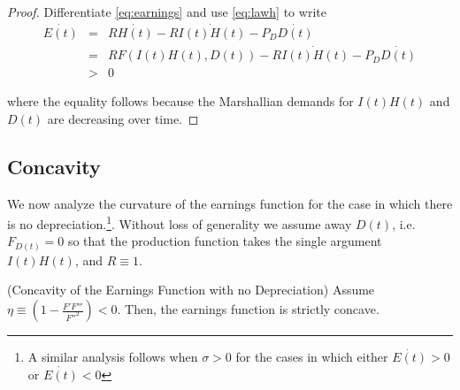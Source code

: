 \begin{proof}
Differentiate \eqref{eq:earnings} and use \eqref{eq:lawh} to write
\begin{eqnarray}
\dot{E(t)} &=& R \dot{H(t)} - R \dot{I(t)H(t)} - P_{D} \dot{D(t)} \nonumber \\
           &=& R F \left( I(t) H(t), D(t) \right) - R \dot{I(t)H(t)} - P_{D} \dot{D(t)} \nonumber \\     
           &>& 0 
\end{eqnarray}

\noindent where the equality follows because the Marshallian demands for $I(t)H(t)$ and $D(t)$ are decreasing over time.
\end{proof}

\subsection{Concavity} \label{section:egdyn}
\indent We now analyze the curvature of the earnings function for the case in which there is no depreciation.\footnote{A similar analysis follows when $\sigma>0$ for the cases in which either $\dot{E(t)}> 0$ or $\dot{E(t)}< 0$}. Without loss of generality we assume away $D(t)$, i.e. $F_{D(t)} = 0 $ so that the production function takes the single argument $I(t) H(t)$, and $R \equiv 1$. 

\begin{claim} (Concavity of the Earnings Function with no Depreciation)
Assume $\eta \equiv \left( 1 - \frac{F'F'''}{{F''}^2} \right) < 0$. Then, the earnings function is strictly concave. 
\end{claim}


